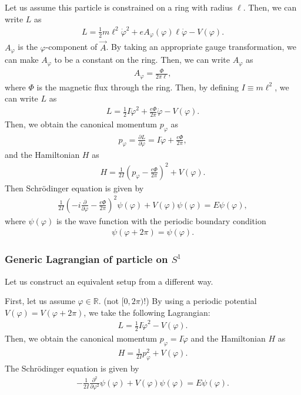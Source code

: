\documentclass[11pt,a4paper]{article}
\begin{document}
Let us assume this particle is constrained on a ring with radius $\ell$. Then, we can write $L$ as
\begin{align}
    L = \frac{1}{2} m \ell^2 \dot\varphi^2 + e A_\varphi(\varphi) \ell \dot\varphi - V(\varphi).
\end{align}
$A_\varphi$ is the $\varphi$-component of $\vec A$.
By taking an appropriate gauge transformation, we can make $A_\varphi$ to be a constant on the ring. Then, we can write $A_\varphi$ as
\begin{align}
    A_\varphi = \frac{\Phi}{2\pi \ell},
\end{align}
where $\Phi$ is the magnetic flux through the ring.
Then, by defining $I \equiv m \ell^2$, we can write $L$ as
\begin{align}
    L = \frac{1}{2} I \dot\varphi^2 + \frac{e \Phi}{2\pi} \dot\varphi - V(\varphi).
\end{align}
Then, we obtain the canonical momentum $p_\varphi$ as
\begin{align}
    p_\varphi = \frac{\partial L}{\partial \dot\varphi} = I \dot\varphi + \frac{e \Phi}{2\pi},
\end{align}
and the Hamiltonian $H$ as
\begin{align}
    H = \frac{1}{2I} \left( p_\varphi - \frac{e\Phi}{2\pi} \right)^2 + V(\varphi).
\end{align}
Then Schr\"odinger equation is given by
\begin{align}
    \frac{1}{2I} \left( -i \frac{\partial}{\partial \varphi} - \frac{e\Phi}{2\pi} \right)^2 \psi(\varphi) + V(\varphi) \psi(\varphi) = E \psi(\varphi),
\end{align}
where $\psi(\varphi)$ is the wave function with the periodic boundary condition
\begin{align}
    \psi(\varphi + 2\pi) = \psi(\varphi).
\end{align}

\subsubsection{Generic Lagrangian of particle on $S^1$}
Let us construct an equivalent setup from a different way.

First, let us assume $\varphi \in \mathbb{R}$. (not $[0,2\pi)$!)
By using a periodic potential $V(\varphi) = V(\varphi + 2\pi)$, we take the following Lagrangian:
\begin{align}
    L = \frac{1}{2} I \dot\varphi^2 - V(\varphi).
\end{align}
Then, we obtain the canonical momentum $p_\varphi = I \dot\varphi$ and the Hamiltonian $H$ as
\begin{align}
    H = \frac{1}{2I} p_\varphi^2 + V(\varphi).
\end{align}
The Schr\"odinger equation is given by
\begin{align}
    -\frac{1}{2I}\frac{\partial^2}{\partial \varphi^2} \psi(\varphi) + V(\varphi) \psi(\varphi) = E \psi(\varphi).
\end{align}
\end{document}
